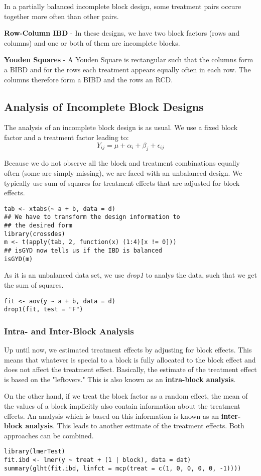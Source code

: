 In a partially balanced incomplete block design, some treatment pairs occure together more often than other pairs.\medskip

\textbf{Row-Column IBD} - In these designs, we have two block factors (rows and columns) and one or both of them are incomplete blocks. \medskip

\textbf{Youden Squares} - A Youden Square is rectangular such that the columns form a BIBD and for the rows each treatment appears equally often in each row. The columns therefore form a BIBD and the rows an RCD.


\subsection{Analysis of Incomplete Block Designs} 

The analysis of an incomplete block design is as usual. We use a fixed block factor and a treatment factor leading to:
$$Y_{ij} = \mu + \alpha_i + \beta_j + \epsilon_{ij}$$

Because we do not observe all the block and treatment combinations equally often (some are simply missing), we are faced with an unbalanced design. We typically use sum of squares for treatment effects that are adjusted for block effects.

\begin{lstlisting}
tab <- xtabs(~ a + b, data = d)
## We have to transform the design information to 
## the desired form
library(crossdes)
m <- t(apply(tab, 2, function(x) (1:4)[x != 0]))
## isGYD now tells us if the IBD is balanced
isGYD(m)
\end{lstlisting}

As it is an unbalanced data set, we use \textit{drop1} to analys the data, such that we get the sum of squares.
\begin{lstlisting}
fit <- aov(y ~ a + b, data = d)
drop1(fit, test = "F")
\end{lstlisting}


\subsubsection{Intra- and Inter-Block Analysis}

Up until now, we estimated treatment effects by adjusting for block effects. This means that whatever is special to a block is fully allocated to the block effect and does not affect the treatment effect. Basically, the estimate of the treatment effect is based on the "leftovers." This is also known as an \textbf{intra-block analysis}. \medskip

On the other hand, if we treat the block factor as a random effect, the mean of the values of a block implicitly also contain information about the treatment effects. An analysis which is based on this information is known as an \textbf{inter-block analysis}. This leads to another estimate of the treatment effects. Both approaches can be combined. 

\begin{lstlisting}
library(lmerTest)
fit.ibd <- lmer(y ~ treat + (1 | block), data = dat)
summary(glht(fit.ibd, linfct = mcp(treat = c(1, 0, 0, 0, 0, -1))))
\end{lstlisting}